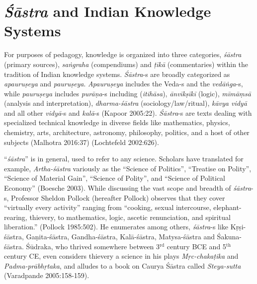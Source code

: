 \section*{{\sl\bfseries Śāstra} and Indian Knowledge Systems}

For purposes of pedagogy, knowledge is organized into three categories, {\sl śāstra} (primary sources), {\sl saṅgraha} (compendiums) and {\sl ṭīkā} (commentaries) within the tradition of Indian knowledge systems. {\sl Śāstra}-s are broadly categorized as {\sl apauruṣeya} and {\sl pauruṣeya}. {\sl Apauruṣeya} includes the Veda-s and the {\sl vedāṅga}-s, while {\sl pauruṣeya} includes {\sl purāṇa}-s including ({\sl itihāsa}), {\sl ānvīkṣīkī} (logic), {\sl mīmāṃsā} (analysis and interpretation), {\sl dharma-śāstra} (sociology/law/ritual), {\sl kāvya vidyā} and all other {\sl vidyā}-s and {\sl kalā}-s (Kapoor 2005:22). {\sl Śāstra}-s are texts dealing with specialized technical knowledge in diverse fields like mathematics, physics, chemistry, arts, architecture, astronomy, philosophy, politics, and a host of other subjects (Malhotra 2016:37) (Lochtefeld 2002:626). 

``{\sl śāstra}'' is in general, used to refer to any science. Scholars have translated for example, {\sl Artha-śāstra} variously as the ``Science of Politics'', ``Treatise on Polity'', ``Science of Material Gain'', ``Science of Polity'', and ``Science of Political Economy'' (Boesche 2003). While discussing the vast scope and breadth of {\sl śāstra}-s, Professor Sheldon Pollock (hereafter Pollock) observes that they cover ``virtually every activity'' ranging from ``cooking, sexual intercourse, elephant-rearing, thievery, to mathematics, logic, ascetic renunciation, and spiritual liberation.'' (Pollock 1985:502). He enumerates among others, \hbox{{\sl śāstra}-s} like Kṛṣi-śāstra, Gaṇita-śāstra, Gandha-śāstra, Kalā-śāstra, Matysa-śāstra and Śakuna-śāstra. Śūdraka, who thrived somewhere between 3$^{\text{rd}}$ century BCE and 5$^{\text{th}}$ century CE, even considers thievery a science in his plays {\sl Mṛc-chakaṭika} and {\sl Padma-prābhṛtaka},  and alludes to a book on Caurya Śāstra called {\sl Steya-sutta} (Varadpande 2005:158-159).

